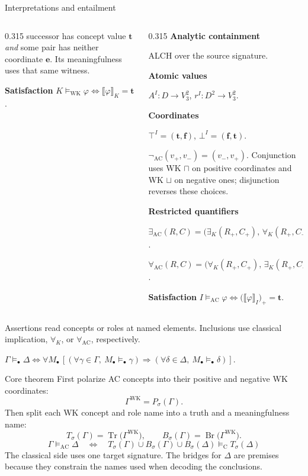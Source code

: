 \documentclass[aspectratio=169,10pt]{beamer}
\newcommand{\WK}{\mathrm{WK}}
\newcommand{\AC}{\mathrm{AC}}
\newcommand{\CL}{\mathrm{C}}
\newcommand{\Tr}{\operatorname{Tr}}
\newcommand{\Br}{\operatorname{Br}}
\newcommand{\val}[1]{\llbracket #1\rrbracket}
\newcommand{\ttv}{\mathbf t}
\newcommand{\eev}{\mathbf e}
\begin{document}
\begin{frame}[t]{Interpretations and entailment}
\begin{columns}[t,onlytextwidth]
\begin{column}{0.315\textwidth}
    successor has concept value $\ttv$ \emph{and}
    some pair has neither coordinate $\eev$.
    Its meaningfulness uses that same witness.\par\smallskip
    \textbf{Satisfaction}\quad
    $K\models_{\WK}\varphi\iff\val{\varphi}_K=\ttv$.
  \end{column}
  \begin{column}{0.315\textwidth}
    {\color{accent}\small\bfseries Analytic containment}\par\smallskip
    ALCH over the source signature.\par\smallskip
    \textbf{Atomic values}\par
    $A^I:D\to V_3^2$,\quad
    $r^I:D^2\to V_3^2$.\par\smallskip
    \textbf{Coordinates}\par
    $\top^I=(\ttv,\mathbf f)$,
    $\bot^I=(\mathbf f,\ttv)$.\par
    $\neg_{\AC}(v_+,v_-)=(v_-,v_+)$.
    Conjunction uses WK $\sqcap$ on positive
    coordinates and WK $\sqcup$ on negative ones;
    disjunction reverses these choices.\par\smallskip
    \textbf{Restricted quantifiers}\par
    $\exists_{\AC}(R,C)=
    \bigl(\exists_K(R_+,C_+),\,
    \forall_K(R_+,C_-)\bigr)$.\par
    $\forall_{\AC}(R,C)=
    \bigl(\forall_K(R_+,C_+),\,
    \exists_K(R_+,C_-)\bigr)$.\par\smallskip
    \textbf{Satisfaction}\quad
    $I\models_{\AC}\varphi\iff
    \bigl(\val{\varphi}_I\bigr)_+=\ttv$.
  \end{column}
\end{columns}
\vfill
\centering
\textcolor{muted}{Assertions read concepts or roles at named elements.
Inclusions use classical implication, $\forall_K$, or $\forall_{\AC}$,
respectively.}\par\smallskip
\textcolor{muted}{$\Gamma\models_\bullet\Delta\iff
\forall M_\bullet\,[
(\forall\gamma\in\Gamma,\ M_\bullet\models_\bullet\gamma)
\Rightarrow
(\forall\delta\in\Delta,\ M_\bullet\models_\bullet\delta)]$.}
\end{frame}

\begin{frame}[t]{Core theorem}
\normalsize
First polarize AC concepts into their positive and negative WK coordinates:
\[
  \Gamma^{\WK}=P_\sigma(\Gamma).
\]
Then split each WK concept and role name into a truth and a meaningfulness name:
\[
  T_\sigma(\Gamma)=\Tr\bigl(\Gamma^{\WK}\bigr),\qquad
  B_\sigma(\Gamma)=\Br\bigl(\Gamma^{\WK}\bigr).
\]
\medskip
\[
  \boxed{\displaystyle
  \Gamma\models_{\AC}\Delta
  \quad\Longleftrightarrow\quad
  T_\sigma(\Gamma)\cup B_\sigma(\Gamma)\cup B_\sigma(\Delta)
  \models_{\CL} T_\sigma(\Delta)}
\]
\medskip
\normalsize
The classical side uses one target signature. The bridges for $\Delta$ are
premises because they constrain the names used when decoding the conclusions.
\end{frame}
\end{document}
